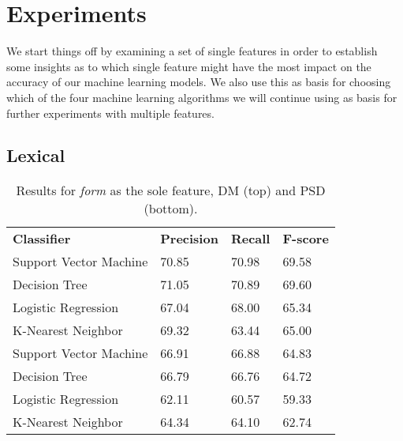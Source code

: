 \section{Experiments}

We start things off by examining a set of single features in order to establish some insights as to which single feature might have the most impact on the accuracy of our machine learning models. We also use this as basis for choosing which of the four machine learning algorithms we will continue using as basis for further experiments with multiple features.



\subsection{Lexical}
\label{results_lex}

\begin{table}
    \centering
    \smaller[0.2]
    \begin{tabular}{@{}llll@{}}
        \toprule
        \textbf{Classifier} & \textbf{Precision} & \textbf{Recall} & \textbf{F-score} \\
        Support Vector Machine & 70.85  &  70.98  &  69.58  \\
        Decision Tree & 71.05  &  70.89  &  69.60 \\
        Logistic Regression & 67.04  &  68.00  &  65.34 \\
        K-Nearest Neighbor & 69.32  &  63.44  &  65.00 \\
        \midrule
        Support Vector Machine & 66.91  &  66.88  &  64.83 \\
        Decision Tree & 66.79  &  66.76  &  64.72 \\
        Logistic Regression &  62.11 &   60.57 &   59.33 \\
        K-Nearest Neighbor & 64.34  &  64.10  &  62.74 \\
        \bottomrule
    \end{tabular}
    \caption{Results for \textit{form} as the sole feature, DM (top) and PSD (bottom).}
    \label{table:form}
\end{table}

